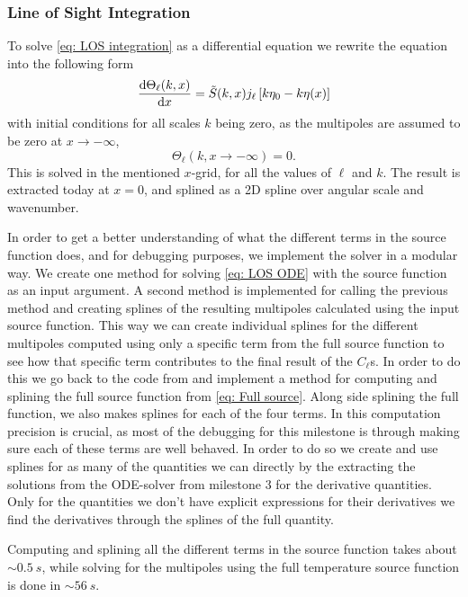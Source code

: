 \documentclass[10pt,a4paper]{article}
\begin{document}
\subsubsection{Line of Sight Integration}
\label{subsubsec:Method/LOS integration}
To solve \cref{eq: LOS integration} as a differential equation we rewrite the equation into the following form
\begin{equation}
  \dv{\Theta_\ell(k,x)}{x} = \tilde{S}(k,x)j_\ell\left[k\eta_0-k\eta(x)\right]
  \label{eq: LOS ODE}
\end{equation}
with initial conditions for all scales $k$ being zero, as the multipoles are assumed to be zero at $x\rightarrow-\infty$,
\begin{equation*}
  \Theta_\ell(k,x\rightarrow-\infty) =0.
\end{equation*}
This is solved in the mentioned $x$-grid, for all the values of $\ell$ and $k$. The result is extracted today at $x=0$, and splined as a 2D spline over angular scale and wavenumber.

In order to get a better understanding of what the different terms in the source function does, and for debugging purposes, we implement the solver in a modular way. We create one method for solving \cref{eq: LOS ODE} with the source function as an input argument. A second method is implemented for calling the previous method and creating splines of the resulting multipoles calculated using the input source function. This way we can create individual splines for the different multipoles computed using only a specific term from the full source function to see how that specific term contributes to the final result of the $C_\ell$s. In order to do this we go back to the code from \cite{milestone3} and implement a method for computing and splining the full source function from \cref{eq: Full source}. Along side splining the full function, we also makes splines for each of the four terms. In this computation precision is crucial, as most of the debugging for this milestone is through making sure each of these terms are well behaved. In order to do so we create and use splines for as many of the quantities we can directly by the extracting the solutions from the ODE-solver from milestone 3 for the derivative quantities. Only for the quantities we don't have explicit expressions for their derivatives we find the derivatives through the splines of the full quantity.

Computing and splining all the different terms in the source function takes about $\sim \SI{0.5}{s}$, while solving for the multipoles using the full temperature source function is done in $\sim \SI{56}{s}$.
\end{document}
